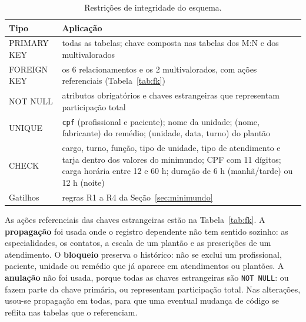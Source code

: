 \documentclass[10pt,a4paper]{article}
\begin{document}
\begin{table}[H]
\centering\footnotesize
\caption{Restrições de integridade do esquema.}
\label{tab:restricoes}
\begin{tabularx}{\textwidth}{lX}
\toprule
Tipo & Aplicação \\
\midrule
PRIMARY KEY & todas as tabelas; chave composta nas tabelas dos M:N e dos multivalorados \\
FOREIGN KEY & os 6 relacionamentos e os 2 multivalorados, com ações referenciais (Tabela~\ref{tab:fk}) \\
NOT NULL & atributos obrigatórios e chaves estrangeiras que representam participação total \\
UNIQUE & \texttt{cpf} (profissional e paciente); nome da unidade; (nome, fabricante) do remédio; (unidade, data, turno) do plantão \\
CHECK & cargo, turno, função, tipo de unidade, tipo de atendimento e tarja dentro dos valores do minimundo; CPF com 11 dígitos; carga horária entre 12 e 60 h; duração de 6 h (manhã/tarde) ou 12 h (noite) \\
Gatilhos & regras R1 a R4 da Seção~\ref{sec:minimundo} \\
\bottomrule
\end{tabularx}
\end{table}

As ações referenciais das chaves estrangeiras \cite{mysql-fk} estão na Tabela~\ref{tab:fk}. A \textbf{propagação} foi usada onde o registro dependente não tem sentido sozinho: as especialidades, os contatos, a escala de um plantão e as prescrições de um atendimento. O \textbf{bloqueio} preserva o histórico: não se exclui um profissional, paciente, unidade ou remédio que já aparece em atendimentos ou plantões. A \textbf{anulação} não foi usada, porque todas as chaves estrangeiras são \texttt{NOT NULL}: ou fazem parte da chave primária, ou representam participação total. Nas alterações, usou-se propagação em todas, para que uma eventual mudança de código se reflita nas tabelas que o referenciam.
\end{document}
